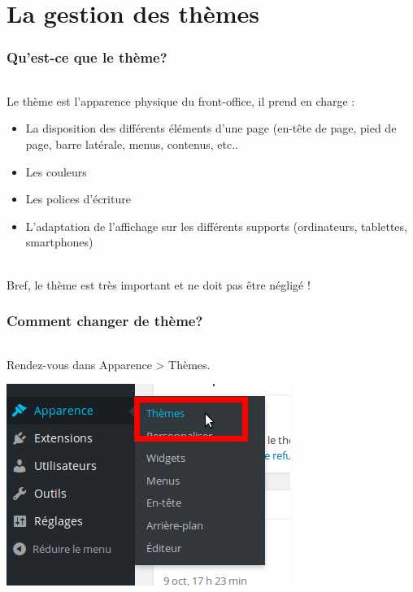 \documentclass[10pt,a4paper]{article}
\begin{document}
\part{La gestion des thèmes}
\newpage
\section{Qu'est-ce que le thème?}
\paragraph{}Le thème est l'apparence physique du front-office, il prend en charge :
\begin{itemize}
\item La disposition des différents éléments d'une page (en-tête de page, pied de page, barre latérale, menus, contenus, etc..
\item Les couleurs
\item Les polices d'écriture
\item L'adaptation de l'affichage sur les différents supports (ordinateurs, tablettes, smartphones)
\end{itemize}
\paragraph{}Bref, le thème est très important et ne doit pas être négligé !
\section{Comment changer de thème?}
\paragraph{}Rendez-vous dans Apparence > Thèmes.
\begin{center}
\includegraphics[scale=0.3]{img/0234.png}
\end{center}
\end{document}
